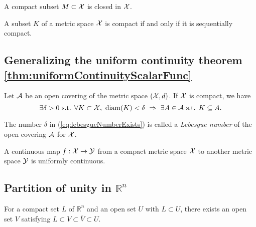 \begin{lem}
  \label{lem:compactImpliesClosed}
  A compact subset $M\subset {\cal X}$ is closed in ${\cal X}$.
\end{lem}

\begin{thm}
  \label{thm:compactIsSequCompact}
  A subset $K$ of a metric space ${\cal X}$ is compact
  if and only if it is sequentially compact. 
\end{thm}

\subsection{Generalizing
  the uniform continuity theorem
  \ref{thm:uniformContinuityScalarFunc}}
\label{sec:gener-unif-cont}

\begin{lem}
  \label{lem:lebesgueNumberExists}
  Let ${\cal A}$ be an open covering
  of the metric space $({\cal X},d)$. 
  If ${\cal X}$ is compact, we have
  \begin{equation}
    \label{eq:lebesgueNumberExists}
    \exists \delta>0 \text{ s.t. }
    \forall K\subset {\cal X},\
    \text{diam}(K)<\delta\ \Rightarrow\
    \exists A\in{\cal A} \text{ s.t. } K\subseteq A.
  \end{equation}
\end{lem}

\begin{defn}
  \label{def:lebesgueNumber}
  The number $\delta$ in (\ref{eq:lebesgueNumberExists})
  is called a \emph{Lebesgue number}
  of the open covering ${\cal A}$ for ${\cal X}$.
\end{defn}

\begin{thm}
  \label{thm:generalizedUniformContinuity}
  A continuous map $f:{\cal X}\rightarrow {\cal Y}$
  from a compact metric space ${\cal X}$
  to another metric space ${\cal Y}$
  is uniformly continuous.
\end{thm}

\subsection{Partition of unity in $\mathbb{R}^n$}
\label{sec:partition-unity}

\begin{lem}
  \label{lem:sandwichCompact}
  For a compact set $L$ of $\mathbb{R}^n$
  and an open set $U$ with $L\subset U$, 
  there exists an open set $V$ satisfying
  $L\subset V\subset \overline{V}\subset U$.
\end{lem}

